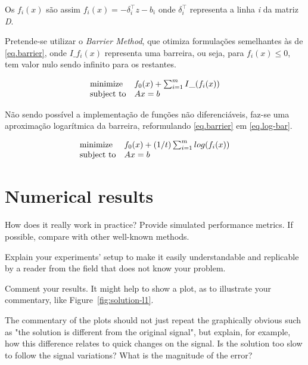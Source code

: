 \documentclass[a4paper]{IEEEtran}
\begin{document}
Os $f_i(x)$ são assim $f_i(x) = -\delta_i^\top z - b_i$ onde $\delta_i^\top$ representa a linha \textit{i} da matriz \textit{D}.

Pretende-se utilizar o \textit{Barrier Method}, que otimiza formulações semelhantes às de \ref{eq.barrier}, onde $I\_f_i(x)$ representa uma barreira, ou seja, para $f_i(x) \leq 0$, tem valor nulo sendo infinito para os restantes.

\begin{equation}
\label{eq.barrier}
\begin{array}[t]{ll} \text{minimize} & f_0(x) + \sum_{i=1}^{m} I\_(f_i(x)) \\
\text{subject to} &  Ax=b \end{array}
\end{equation}

Não sendo possível a implementação de funções não diferenciáveis, faz-se uma aproximação logarítmica da barreira, reformulando \ref{eq.barrier} em \ref{eq.log-bar}.

\begin{equation}
\label{eq.log-bar}
\begin{array}[t]{ll} \text{minimize} & f_0(x) + (1/t) \sum_{i=1}^{m} log(f_i(x)) \\
\text{subject to} &  Ax=b \end{array}
\end{equation}

\section{Numerical results}
\label{sec:numerical-results}

How does it really work in practice? Provide simulated performance
metrics. If possible, compare with other well-known methods.

Explain your experiments' setup to make it easily understandable and
replicable by a reader from the field that does not know your problem.

Comment your results. It might help to show a plot, as to illustrate
your commentary, like Figure~\ref{fig:solution-l1}.


The commentary of the plots should not just repeat the graphically
obvious such as "the solution is different from the original signal",
but explain, for example, how this difference relates to quick changes
on the signal. Is the solution too slow to follow the signal
variations? What is the magnitude of the error?
\end{document}
